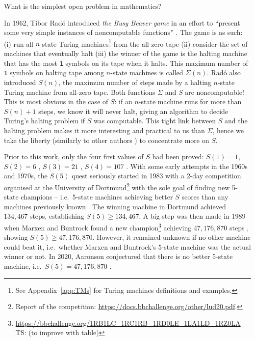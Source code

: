 \documentclass[a4paper,british]{article}
\theoremstyle{definition} %
\numberwithin{equation}{section}
\theoremstyle{definition} %
\newcommand{\ts}[1]{{\color{red}#1}}
\newcommand{\sone}{\texttt{1}\xspace}
\newcommand{\BBtheFifth}{47{,}176{,}870}
\newcommand{\radofull}{Tibor Rad\'o\xspace}
\newcommand{\rado}{Rad\'o\xspace}
\begin{document}
\newcommand{\noncomput}{noncomputable\xspace}
\newcommand{\BBfull}{Busy Beaver\xspace}
\newcommand{\Coq}{Coq\xspace}
\newcommand{\CoqProofReleaseURL}{\url{https://github.com/ccz181078/Coq-BB5}}

\newcommand{\ie}{i.e.~}
\newcommand{\eg}{e.g.~}

What is the simplest open problem in mathematics?

In 1962, \radofull introduced \textit{the \BBfull game} in an effort to ``present some very simple instances of \noncomput functions'' \cite{Rado_1962}. The game is as such: (i) run all $n$-state Turing machines\footnote{See Appendix~\ref{app:TMs} for Turing machines definitions and examples.} from the all-zero tape (ii) consider the set of machines that eventually halt (iii) the winner of the game is the halting machine that has the most \sone symbols on its tape when it halts. This maximum number of \sone symbols on halting tape among $n$-state machines is called $\Sigma(n)$. \rado also introduced $S(n)$, the maximum number of steps made by a halting $n$-state Turing machine from all-zero tape. Both functions $\Sigma$ and $S$ are \noncomput! This is most obvious in the case of $S$: if an $n$-state machine runs for more than $S(n)+1$ steps, we know it will never halt, giving an algorithm to decide Turing's halting problem if $S$ was computable. This tight link between $S$ and the halting problem makes it more interesting and practical to us than $\Sigma$, hence we take the liberty (similarly to other authors \cite{BusyBeaverFrontier,otherexamples?}) to concentrate more on $S$.

Prior to this work, only the four first values of $S$ had been proved: $S(1)=1$, $S(2)=6$ \cite{Rado_1962}, $S(3) = 21$ \cite{Lin1963}, $S(4) = 107$ \cite{Brady83}. With some early attempts in the 1960s and 1970s, the $S(5)$ quest seriously started in 1983 with a 2-day competition organised at the University of Dortmund\footnote{Report of the competition: \url{https://docs.bbchallenge.org/other/lud20.pdf}.} with the sole goal of finding new 5-state champions -- \ie 5-state machines achieving better $S$ scores than any machines previously known \cite{PMichel_website,michel2019busy}. The winning machine in Dortmund achieved $134,467$ steps, establishing $S(5) \geq 134,467$. A big step was then made in 1989 when Marxen and Buntrock found a new champion\footnote{\url{https://bbchallenge.org/1RB1LC_1RC1RB_1RD0LE_1LA1LD_1RZ0LA} \ts{TS: (to improve with table)}} achieving $\BBtheFifth$ steps \cite{Marxen_1990}, showing $S(5) \geq \BBtheFifth$. However, it remained unknown if no other machine could beat it, \ie whether Marxen and Buntrock's 5-state machine was the actual winner or not. In 2020, Aaronson conjectured that there is no better 5-state machine, \ie $S(5) = \BBtheFifth$ \cite{BusyBeaverFrontier}.
\end{document}
